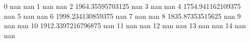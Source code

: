 0 nan nan
1 nan nan
2 1964.35595703125 nan
3 nan nan
4 1754.941162109375 nan
5 nan nan
6 1998.234130859375 nan
7 nan nan
8 1835.87353515625 nan
9 nan nan
10 1912.3397216796875 nan
11 nan nan
12 nan nan
13 nan nan
14 nan nan
